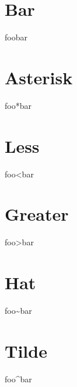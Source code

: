 \documentclass[a4paper,11pt,oneside,openany,report]{jsbook}
\begin{document}
\section{Bar}\label{sec:Specialcharacters/Bar}
foo{\textbar}bar

\section{Asterisk}\label{sec:Specialcharacters/Asterisk}
foo*bar

\section{Less}\label{sec:Specialcharacters/Less}
foo{\textless}bar

\section{Greater}\label{sec:Specialcharacters/Greater}
foo{\textgreater}bar

\section{Hat}\label{sec:Specialcharacters/Hat}
foo{\textasciitilde}bar

\section{Tilde}\label{sec:Specialcharacters/Tilde}
foo{\textasciicircum}bar
\end{document}
